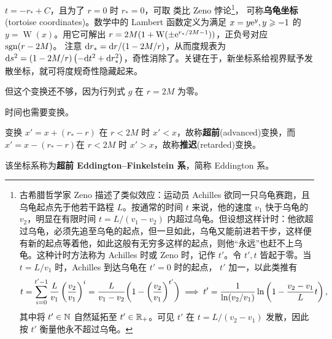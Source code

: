 $t=-r_*+C$，且为了 $r=0$ 时 $r_*=0$，可取
类比 Zeno 悖论\footnote{古希腊哲学家 Zeno 描述了类似效应：运动员 Achilles 欲同一只乌龟赛跑，且乌龟起点先于他若干路程 $L$。按通常的时间 $t$ 来说，他的速度 $v_1$ 快于乌龟的 $v_2$，明显在有限时间 $t=L/(v_1-v_2)$ 内超过乌龟。但设想这样计时：他欲超过乌龟，必须先追至乌龟的起点，但一旦如此，乌龟又能前进若干步，这样便有新的起点等着他，如此这般有无穷多这样的起点，则他“永远”也赶不上乌龟。这种计时方法称为 Achilles 时或 Zeno 时，记作 $t'$。令 $t',t$ 皆起于零。当 $t=L/v_1$ 时，Achilles 到达乌龟在 $t'=0$ 时的起点， $t'$ 加一，以此类推有
\[t=\sum_{i=0}^{t'-1} \frac{L}{v_1}\left(\frac{v_2}{v_1}\right)^{i}=\frac{L}{v_1-v_2}\bigg(1-\bigg(\frac{v_2}{v_1}\bigg)^{t'}\bigg)\implies t'=\frac{1}{\ln(v_2/v_1)}\ln\left(1-\frac{v_2-v_1}{L}t\right),\]
其中将 $t'\in\mathbb{N}$ 自然延拓至 $t'\in\mathbb{R}_+$。可见 $t'$ 在 $t=L/(v_2-v_1)$ 发散，因此按 $t'$ 衡量他永不超过乌龟。}，
可称\textbf{乌龟坐标}(tortoise coordinates)。数学中的 Lambert 函数定义为满足 $x=y\mathrm{e}^y,y\geqslant -1$ 的$y=\operatorname{W}(x)$。用它可解出 $r=2M(1+\operatorname{W}(\pm\mathrm{e}^{r_*/2M-1}))$，正负号对应 $\operatorname{sgn}(r-2M)$。
注意 $\dd r_*={\dd r}/{(1-2M/r)}$，从而度规表为 $\dd s^2=(1-2M/r)\left(-\dd t^2+\dd r_*^2\right)$，奇性消除了。关键在于，新坐标系给视界赋予发散坐标，就可将度规奇性隐藏起来。

但这个变换还不够，因为行列式 $g$ 在 $r=2M$ 为零。

时间也需要变换。

变换 $x'=x+(r_*-r)$ 在 $r<2M$ 时 $x'<x$，故称\textbf{超前}(advanced)变换，而 $x'=x-(r_*-r)$在 $r<2M$ 时 $x'>x$，故称\textbf{推迟}(retarded)变换。

该坐标系称为\textbf{超前 Eddington–Finkelstein 系}，简称 Eddington 系。




